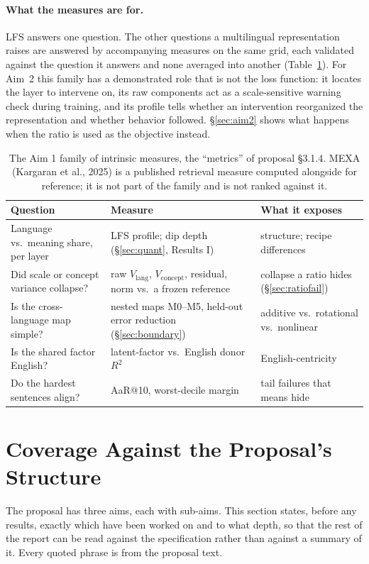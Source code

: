 \documentclass[11pt,a4paper]{article}
\begin{document}
\paragraph{What the measures are for.}
LFS answers one question. The other questions a multilingual representation
raises are answered by accompanying measures on the same grid, each validated
against the question it answers and none averaged into another
(Table~\ref{tab:familyreport}). For Aim~2 this family has a demonstrated
role that is not the loss function: it locates the layer to intervene on, its
raw components act as a scale-sensitive warning check during training, and its
profile tells whether an intervention reorganized the representation and
whether behavior followed. \S\ref{sec:aim2} shows what happens when the
ratio is used as the objective instead.

\begin{table}[H]
\centering
\small
\caption{The Aim 1 family of intrinsic measures, the ``metrics'' of
proposal \S3.1.4. MEXA (Kargaran et al., 2025) is a published retrieval
measure computed alongside for reference; it is not part of the family and
is not ranked against it.}
\begin{tabular}{p{4.6cm}p{5.0cm}p{4.6cm}}
\toprule
Question & Measure & What it exposes \\
\midrule
Language vs.\ meaning share, per layer & LFS profile; dip depth (\S\ref{sec:quant}, Results I) & structure; recipe differences \\
Did scale or concept variance collapse? & raw $V_{\mathrm{lang}}$, $V_{\mathrm{concept}}$, residual, norm vs.\ a frozen reference & collapse a ratio hides (\S\ref{sec:ratiofail}) \\
Is the cross-language map simple? & nested maps M0--M5, held-out error reduction (\S\ref{sec:boundary}) & additive vs.\ rotational vs.\ nonlinear \\
Is the shared factor English? & latent-factor vs.\ English donor $R^2$ & English-centricity \\
Do the hardest sentences align? & AaR@10, worst-decile margin & tail failures that means hide \\
\bottomrule
\end{tabular}
\label{tab:familyreport}
\end{table}

\section{Coverage Against the Proposal's Structure}
\label{sec:coverage}
The proposal has three aims, each with sub-aims. This section states, before
any results, exactly which have been worked on and to what depth, so that the
rest of the report can be read against the specification rather than against
a summary of it. Every quoted phrase is from the proposal text.
\end{document}

